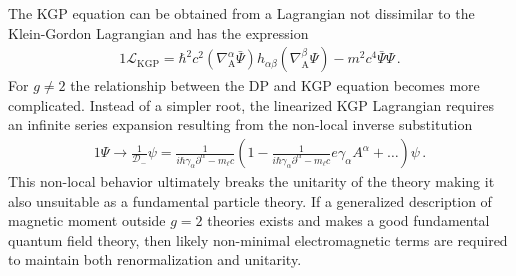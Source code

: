The KGP equation can be obtained from a Lagrangian not dissimilar to the Klein-Gordon Lagrangian and has the expression
\begin{alignat}{1}
	\label{eq:problems02} \mathcal{L}_{\mathrm{KGP}}=\hbar^{2}c^{2}\left(\nabla^{\alpha}_{\mathrm{A}}\bar{\Psi}\right)h_{\alpha\beta}\left(\nabla^{\beta}_{\mathrm{A}}\Psi\right)-m^{2}c^{4}\bar{\Psi}\Psi\,.
\end{alignat}
For $g\neq2$ the relationship between the DP and KGP equation becomes more complicated. Instead of a simpler root, the linearized KGP Lagrangian requires an infinite series expansion \citep{Veltman:1997am} resulting from the non-local inverse substitution 
\begin{alignat}{1}
	\label{eq:kgp:04} \Psi\rightarrow\frac{1}{\mathcal{D}_{-}}\psi=\frac{1}{i\hbar\gamma_{\alpha}\partial^{\alpha}-m_{\ell}c}\left(1-\frac{1}{i\hbar\gamma_{\alpha}\partial^{\alpha}-m_{\ell}c}e\gamma_{\alpha}A^{\alpha}+\ldots\right)\psi\,.
\end{alignat}
This non-local behavior ultimately breaks the unitarity of the theory making it also unsuitable as a fundamental particle theory. If a generalized description of magnetic moment outside $g=2$ theories exists and makes a good fundamental quantum field theory, then likely non-minimal electromagnetic terms are required to maintain both renormalization and unitarity.



